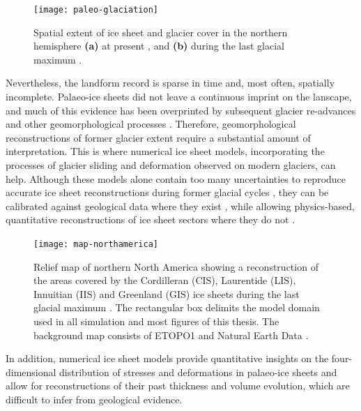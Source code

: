 \documentclass[a4paper]{kappa}
\newcommand{\chem}[1]{\ensuremath{\mathrm{#1}}}
\begin{document}
\begin{figure}
  \texttt{[image: paleo-glaciation]}
  \caption{Spatial extent of ice sheet and glacier cover in the northern
           hemisphere \textbf{(a)} at present \citep{Patterson.Kelso.2014}, and
           \textbf{(b)} during the last glacial maximum
           \citep{Ehlers.Gibbard.2007}.}
  \label{fig:paleo-glaciation}
\end{figure}

Nevertheless, the landform record is sparse in time and, most often, spatially
incomplete. Palaeo-ice sheets did not leave a continuous imprint on the
lanscape, and much of this evidence has been overprinted by subsequent glacier
re-advances and other geomorphological processes \citep{Kleman.1994,
Kleman.etal.2006, Kleman.etal.2010}.
Therefore, geomorphological reconstructions of former glacier extent require a
substantial amount of interpretation. This is where numerical ice sheet models,
incorporating the processes of glacier sliding \citep[e.g.,][]{Weertman.1957}
and deformation \citep[e.g.,][]{Nye.1953} observed on modern glaciers, can
help. Although these models alone contain too many uncertainties to reproduce
accurate ice sheet reconstructions during former glacial cycles
\citep[e.g.,][]{Hebeler.etal.2008}, they can be calibrated against geological
data where they exist \citep{Napieralski.etal.2007}, while allowing
physics-based, quantitative reconstructions of ice sheet sectors where they do
not \citep[e.g.,][]{Marshall.etal.2002, Tarasov.Peltier.2004}.

\begin{figure}
  \texttt{[image: map-northamerica]}
  \caption{Relief map of northern North America showing a reconstruction of the
           areas covered by the Cordilleran (CIS), Laurentide (LIS), Innuitian
           (IIS) and Greenland (GIS) ice sheets during the last glacial maximum
           \citep[21.4 to 16.8\,cal\,\chem{^{14}C}\,kyr\,BP,][]{Dyke.2004}.
           The rectangular box delimits the model domain used in all simulation
           and most figures of this thesis. The background
           map consists of ETOPO1 \citep{Amante.Eakins.2009} and Natural Earth
           Data \citep{Patterson.Kelso.2014}.}
  \label{fig:map-northamerica}
\end{figure}

In addition, numerical ice sheet models provide quantitative insights on the
four-dimensional distribution of stresses and deformations in palaeo-ice sheets
and allow for reconstructions of their past thickness and volume evolution, which
are difficult to infer from geological evidence.
\end{document}

